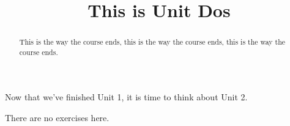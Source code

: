 \documentclass{ximera}
\title{This is Unit Dos}
\begin{document}
\begin{abstract}
  This is the way the course ends, this is the way the course ends, this is the way the course ends.
\end{abstract}

Now that we've finished Unit 1, it is time to think about Unit 2.


There are no exercises here.
\end{document}
